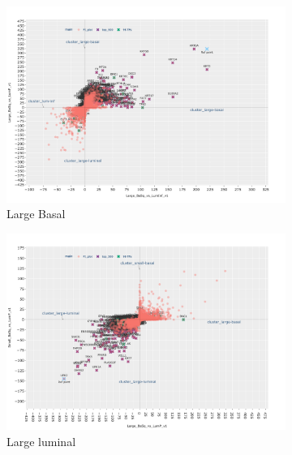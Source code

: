 \begin{figure}[!h]
    \captionsetup[subfigure]{justification=Centering}
\centering
\begin{subfigure}[!t]{0.49\linewidth}
    \includegraphics[width=\textwidth,keepaspectratio]{Sections/Network_I/Resources/selective_pruning/pi_gsea/pi_largeBasal.png}
    \caption{Large Basal}
\end{subfigure}
\centering
\begin{subfigure}[!t]{0.49\textwidth}
    \includegraphics[width=\textwidth,keepaspectratio]{Sections/Network_I/Resources/selective_pruning/pi_gsea/pi_largeLuminal.png}
    \caption{Large luminal}
\end{subfigure}
\centering
\begin{subfigure}[!t]{0.49\linewidth}

\end{subfigure}
\end{figure}
